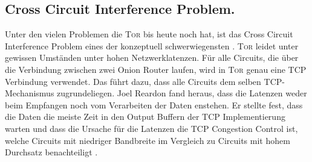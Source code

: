 \documentclass[fleqn,envcountsame,runningheads,10pt,a4paper]{llncs}
\begin{document}
\subsection{Cross Circuit Interference Problem.}
\label{sec:crosscircuitinterference} 

Unter den vielen Problemen die \textsc{Tor} bis heute noch hat, ist das Cross Circuit Interference Problem eines der konzeptuell schwerwiegensten \cite{tor_improvements}.
\textsc{Tor} leidet unter gewissen Umständen unter hohen Netzwerklatenzen.
Für alle Circuits, die über die Verbindung zwischen zwei Onion Router laufen, wird in \textsc{Tor} genau eine TCP Verbindung verwendet.
Das führt dazu, dass alle Circuits dem selben TCP-Mechanismus zugrundeliegen.
Joel Reardon fand heraus, dass die Latenzen weder beim Empfangen noch vom Verarbeiten der Daten enstehen.
Er stellte fest, dass die Daten die meiste Zeit in den Output Buffern der TCP Implementierung warten und dass die Ursache für die Latenzen die TCP Congestion Control ist, welche Circuits mit niedriger Bandbreite im Vergleich zu Circuits mit hohem Durchsatz benachteiligt \cite{tcp-over-dtls-thesis,tcp-over-dtls}.

\begin{figure}[bh]
\end{figure} 
\end{document}
